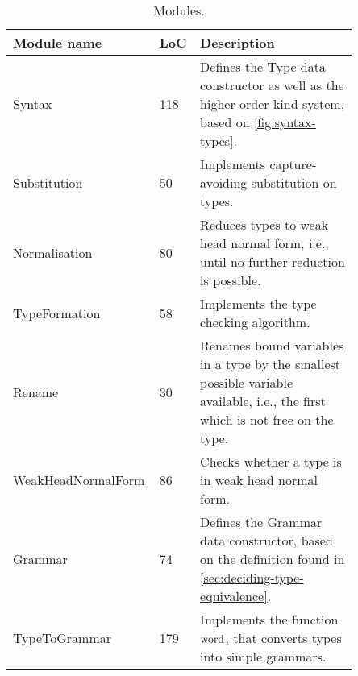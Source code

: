 \renewcommand{\arraystretch}{1.2}
\begin{table}[h!]
    \centering
    \begin{tabular}{| @{\hskip 0.1in}p{0.3\linewidth}@{\hskip 0.1in} | @{\hskip 0.1in}p{0.10\linewidth}@{\hskip 0.1in} | @{\hskip 0.1in}p{0.45\linewidth}|}
        \hline
        \textbf{Module name} & \textbf{LoC} & \textbf{Description}\\
        \hline
        Syntax & 118 & Defines the Type data constructor as well as the higher-order kind system, based on \cref*{fig:syntax-types}.\\
        \hline
        Substitution & 50 & Implements capture-avoiding substitution on types.\\
        \hline
        Normalisation & 80 & Reduces types to weak head normal form, i.e., until no further reduction is possible.\\
        \hline
        TypeFormation & 58 & Implements the type checking algorithm.\\
        \hline
        Rename & 30 & Renames bound variables in a type by the smallest possible variable available, i.e., the first which is not free on the type.\\
        \hline
        WeakHeadNormalForm & 86 & Checks whether a type is in weak head normal form.\\
        \hline
        Grammar & 74 & Defines the Grammar data constructor, based on the definition found in \cref*{sec:deciding-type-equivalence}.\\
        \hline
        TypeToGrammar & 179 & Implements the function $\operatorname{word}$, that converts types into simple grammars.\\
        \hline
    \end{tabular}
    \caption{Modules.}
    \label{tab:modules}
\end{table}